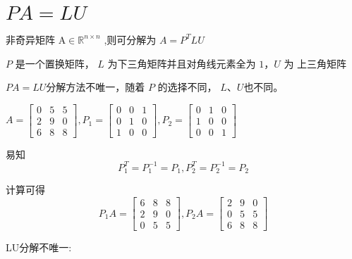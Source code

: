 \section{\texorpdfstring{$PA=LU$}{PA=LU}}

\begin{theorem}
    非奇异矩阵 $ \mathrm{A} \in \mathbb{R}^{n \times n} $ ,则可分解为 $ A=P^{T} L U $

    $ P $ 是一个置换矩阵， $ L $ 为下三角矩阵并且对角线元素全为 $ 1 ， U $ 为 上三角矩阵
\end{theorem}


$PA=LU$分解方法不唯一，随着 $ P $ 的选择不同， $L$、$U$也不同。

\begin{example}[$PA=LU$]


    $ A=\left[\begin{array}{lll}0 & 5 & 5 \\ 2 & 9 & 0 \\ 6 & 8 & 8\end{array}\right], P_{1}=\left[\begin{array}{lll}0 & 0 & 1 \\ 0 & 1 & 0 \\ 1 & 0 & 0\end{array}\right], P_{2}=\left[\begin{array}{lll}0 & 1 & 0 \\ 1 & 0 & 0 \\ 0 & 0 & 1\end{array}\right] $

    易知
    \begin{equation}P_{1}^{T}=P_{1}^{-1}=P_{1}, P_{2}^{T}=P_{2}^{-1}=P_{2}\end{equation}

    计算可得
    \begin{equation} P_{1} A=\left[\begin{array}{lll}6 & 8 & 8 \\ 2 & 9 & 0 \\ 0 & 5 & 5\end{array}\right], P_{2} A=\left[\begin{array}{lll}2 & 9 & 0 \\ 0 & 5 & 5 \\ 6 & 8 & 8\end{array}\right] \end{equation}

    LU分解不唯一:


\end{example}
